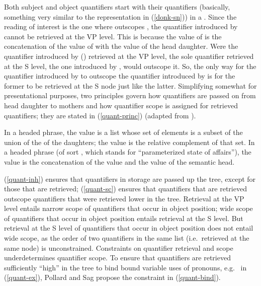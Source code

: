 \documentclass[output=paper
	        ,collection
	        ,collectionchapter
 	        ,biblatex
                ,babelshorthands
                ,newtxmath
                ,draftmode
                ,colorlinks, citecolor=brown
]{langscibook}
\begin{document}
Both subject and object quantifiers start with their quantifiers (basically, something very similar to the representation in (\ref{donk-sn})) in a . Since the reading of interest is the one where  outscopes , the quantifier introduced by  cannot be retrieved at the VP level. This is because the value of  is the concatenation of the value of  with the  value of the head daughter. Were the quantifier introduced by  () retrieved at the VP level, the sole quantifier retrieved at the S level, the one introduced by , would outscope it. So, the only way for the quantifier introduced by  to outscope the quantifier introduced by  is for the former to be retrieved at the S node just like the latter. Simplifying somewhat for presentational purposes, two principles govern how quantifiers are passed on from head daughter to mothers and how quantifier scope is assigned for retrieved quantifiers; they are stated in (\ref{quant-princ}) (adapted from \citealt[322--323]{PollardandSag1994}).



\eal \label{quant-princ}
\ex\label{quant-inh}
In a headed phrase, the  value is a list whose set of elements is a subset of the union of the  of the daughters; the  value is the relative complement of that set.
\ex\label{quant-sc}
In a headed phrase (of sort , which stands for ``parameterized state of affairs''), the  value is the concatenation of the  value and the  value of the semantic head.
\zl


(\ref{quant-inh}) ensures that quantifiers in storage are passed up the tree, except for those that are retrieved; (\ref{quant-sc}) ensures that quantifiers that are retrieved outscope quantifiers that were retrieved lower in the tree. Retrieval at the VP level entails narrow scope of quantifiers that occur in object position; wide scope of quantifiers that occur in object position entails retrieval at the S level. But retrieval at the S level of quantifiers that occur in object position does not entail wide scope, as the order of two quantifiers in the same  list (i.e.\ retrieved at the same node) is unconstrained. Constraints on quantifier retrieval and scope underdetermines quantifier scope. To ensure that quantifiers are retrieved sufficiently ``high'' in the tree to bind bound variable uses of pronouns, e.g.\  in (\ref{quant-ex}), Pollard and Sag propose the constraint in (\ref{quant-bind}).
\end{document}
